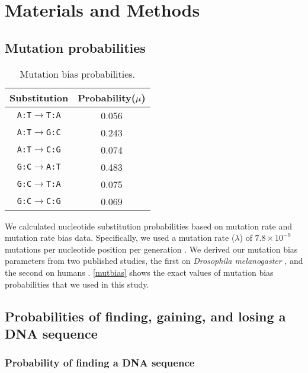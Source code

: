 \documentclass[12pt,a4paper]{article}
\begin{document}
\section{Materials and Methods}

\subsection{Mutation probabilities}

\begin{table}[H]
\centering
\begin{tabular}{c c}
\toprule
\textbf{Substitution} & Probability($\mu$) \\\midrule
\texttt{A:T}$\to$\texttt{T:A} & 0.056 \\\midrule
\texttt{A:T}$\to$\texttt{G:C} & 0.243 \\\midrule
\texttt{A:T}$\to$\texttt{C:G} & 0.074 \\\midrule
\texttt{G:C}$\to$\texttt{A:T} & 0.483 \\\midrule
\texttt{G:C}$\to$\texttt{T:A} & 0.075 \\\midrule
\texttt{G:C}$\to$\texttt{C:G} & 0.069 \\\bottomrule
\end{tabular}
\caption{Mutation bias probabilities.}
\label{mutbias}
\end{table}

We calculated nucleotide substitution probabilities based on mutation rate and mutation rate bias data. Specifically, we  used a mutation rate ($\lambda$) of $7.8\times10^{-9}$ mutations per nucleotide position per generation \citep{drosophilamutrate}. We derived our mutation bias parameters from two published studies, the first on \textit{Drosophila melanogaster} \citep{drosophilamutrate}, and the second on humans \citep{humanmutrate}. \autoref{mutbias} shows the exact values of mutation bias probabilities that we used in this study.



\subsection{Probabilities of finding, gaining, and losing a DNA sequence}
\label{methbasic}

\subsubsection{Probability of finding a DNA sequence}
\label{methprob}
\end{document}
